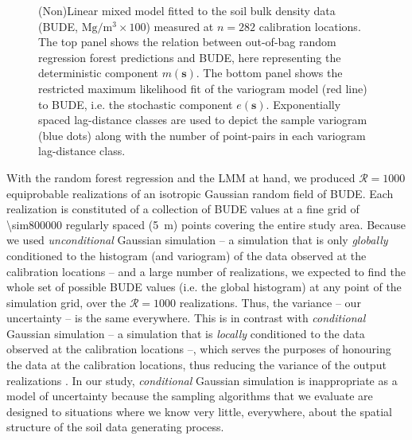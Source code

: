 \begin{figure}[!ht]
\begin{minipage}{0.60\textwidth}
 \end{minipage}
 \caption[(Non)Linear mixed model fitted to the soil bulk density data.]{(Non)Linear mixed model fitted to the 
 soil bulk density data (BUDE, $\si{\mega\gram\per\cubic\metre} \times 100$) measured at $n = 282$ 
calibration locations. The top panel shows the relation between out-of-bag random regression forest 
predictions and BUDE, here representing the deterministic component $m(\boldsymbol{s})$. The bottom panel shows 
the restricted maximum likelihood fit of the variogram model (red line) to BUDE, i.e. the stochastic component 
$e(\boldsymbol{s})$. Exponentially spaced lag-distance classes are used to depict the sample variogram (blue 
dots) along with the number of point-pairs in each variogram lag-distance class.}
 \label{fig:chap08-bude-vario}
\end{figure}

With the random forest regression and the LMM at hand, we produced $\mathcal{R} = 1000$ equiprobable 
realizations of an isotropic Gaussian random field of BUDE. Each realization is constituted of a collection of 
BUDE values at a fine grid of \num{\sim800000} regularly spaced (\SI{5}{\metre}) points covering the entire 
study area. Because we used \emph{unconditional} Gaussian simulation -- a simulation that is only 
\emph{globally} conditioned to the histogram (and variogram) of the data observed at the calibration locations 
\cite{Goovaerts1997} -- and a large number of realizations, we expected to find the whole set of possible BUDE 
values (i.e. the global histogram) at any point of the simulation grid, over the $\mathcal{R} = 1000$ 
realizations. Thus, the variance -- our uncertainty -- is the same everywhere. This is in contrast with 
\emph{conditional} Gaussian simulation -- a simulation that is \emph{locally} conditioned to the data observed 
at the calibration locations --, which serves the purposes of honouring the data at the calibration locations, 
thus reducing the variance of the output realizations \cite{Goovaerts1997}. In our study, \emph{conditional} 
Gaussian simulation is inappropriate as a model of uncertainty because the sampling algorithms that we evaluate 
are designed to situations where we know very little, everywhere, about the spatial structure of the soil data 
generating process.

